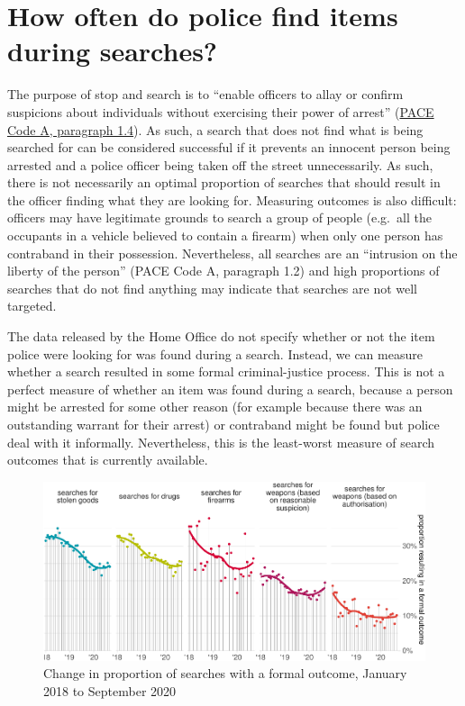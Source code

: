 \documentclass[
  a4paper,
  twoside, 11pt]{article}
\begin{document}
\hypertarget{how-often-do-police-find-items-during-searches}{%
\section{How often do police find items during searches?}\label{how-often-do-police-find-items-during-searches}}

The purpose of stop and search is to ``enable officers to allay or confirm suspicions about individuals without exercising their power of arrest'' (\href{https://www.gov.uk/guidance/police-and-criminal-evidence-act-1984-pace-codes-of-practice}{PACE Code A, paragraph 1.4}). As such, a search that does not find what is being searched for can be considered successful if it prevents an innocent person being arrested and a police officer being taken off the street unnecessarily. As such, there is not necessarily an optimal proportion of searches that should result in the officer finding what they are looking for. Measuring outcomes is also difficult: officers may have legitimate grounds to search a group of people (e.g.~all the occupants in a vehicle believed to contain a firearm) when only one person has contraband in their possession. Nevertheless, all searches are an ``intrusion on the liberty of the person'' (PACE Code A, paragraph 1.2) and high proportions of searches that do not find anything may indicate that searches are not well targeted.

The data released by the Home Office do not specify whether or not the item police were looking for was found during a search. Instead, we can measure whether a search resulted in some formal criminal-justice process. This is not a perfect measure of whether an item was found during a search, because a person might be arrested for some other reason (for example because there was an outstanding warrant for their arrest) or contraband might be found but police deal with it informally. Nevertheless, this is the least-worst measure of search outcomes that is currently available.



\begin{figure}[tb]

{\centering \includegraphics{2020-Q3_files/figure-latex/chart-results-1} 

}

\caption{Change in proportion of searches with a formal outcome, January 2018 to September 2020}\label{fig:chart-results}
\end{figure}
\end{document}
